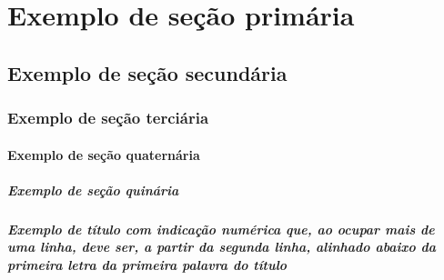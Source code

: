 \chapter{Exemplo de seção primária} 
  \lipsum[1]

  \section{Exemplo de seção secundária}
  \lipsum[2-4]

  \subsection{Exemplo de seção terciária}
  \lipsum[5]

  \subsubsection{Exemplo de seção quaternária}
  \lipsum[6]

  \paragraph{Exemplo de seção quinária} %
  \lipsum[7]

  \paragraph{Exemplo de título com indicação numérica que, ao ocupar mais de uma linha, deve ser, a partir da segunda linha, alinhado abaixo da primeira letra da primeira palavra do título}
  \lipsum[8]